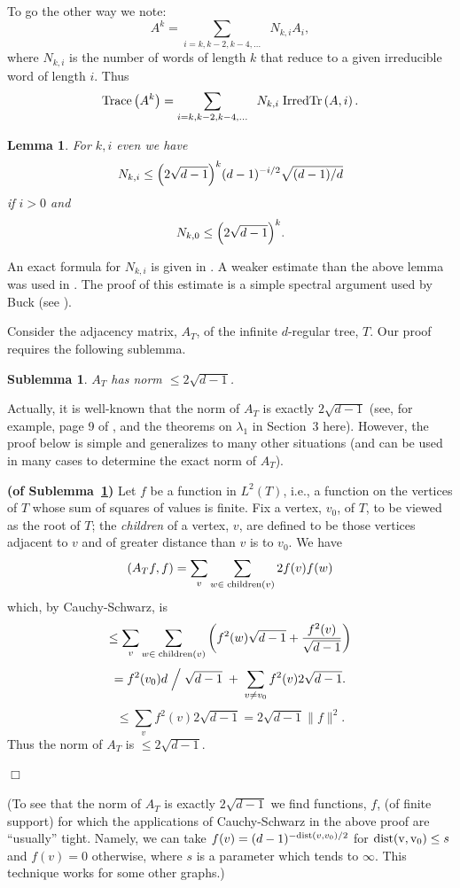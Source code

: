 \documentclass[12pt]{article}
\newtheorem{lemma}[theorem]{Lemma}
\newtheorem{sublemma}[theorem]{Sublemma}
\newcommand{\irdtr}[2]{{\rm IrredTr}\left(#1,#2\right)}
\newcommand{\proof}{{\par\noindent {\bf Proof}\space\space}}
\newcommand{\proofbox}{\begin{flushright}$\Box$\end{flushright}}
\newcommand{\Trace}[1]{{\rm Trace}\left( #1 \right) }
\begin{document}
To go the other way
we note:
\begin{equation}\label{eq:other_way}
A^k = \sum_{i=k,k-2,k-4,\ldots} \;\; N_{k,i} A_i,
\end{equation}
where $N_{k,i}$ is the number of words of length $k$ that reduce to a given
irreducible word
of length $i$.
Thus
$$
\Trace{A^k} = \sum_{i=k,k-2,k-4,\ldots} \;\; N_{k,i} \;\irdtr{A}{i}.
$$
\begin{lemma}\label{lm:reducedwalks}
For $k,i$ even we have
$$
N_{k,i} \le \Bigl( 2\sqrt{d-1}\Bigr)^k (d-1)^{-i/2}\sqrt{(d-1)/d}
$$
if $i>0$ and
$$
N_{k,0} \le \Bigl( 2\sqrt{d-1}\Bigr)^k.
$$
\end{lemma}
An exact formula for $N_{k,i}$ is given in \cite{mckay}.  A weaker
estimate than the above lemma
was used in \cite{friedman_random_graphs}.  The proof of this
estimate is a simple spectral argument used by Buck (see \cite{buck,
friedman_relative}).
\proof 
Consider
the adjacency matrix, $A_T$, of the infinite $d$-regular tree, $T$.
Our proof requires the following sublemma.
\begin{sublemma}\label{lm:tree_norm}
$A_T$ has norm $\le 2\sqrt{d-1}$.
\end{sublemma}
Actually, it is well-known that the norm of $A_T$ is exactly $2\sqrt{d-1}$
(see, for example, page 9 of
\cite{woess}, and the theorems on $\lambda_1$ in Section~3
here).  However, the proof below is simple and generalizes to many other
situations (and can be used in many cases to determine the exact norm of
$A_T$).
\proof {\bf (of Sublemma~\ref{lm:tree_norm})}\space\space
Let $f$ be a function in $L^2(T)$, i.e., a function on the vertices
of $T$ whose sum of squares of values is finite.  Fix a vertex, $v_0$, of $T$,
to be viewed as the root of $T$; the {\em children} of a vertex, $v$, are
defined to be those vertices adjacent to $v$ and of greater distance 
than $v$ is to
$v_0$.
We have
$$
(A_Tf,f) = \sum_v\sum_{w\in\;{\rm children}(v)} 2 f(v)f(w)
$$
which, by Cauchy-Schwarz, is
$$
\le \sum_v\sum_{w\in\;{\rm children}(v)} \left( f^2(w)\sqrt{d-1} + 
\frac{f^2(v)}{\sqrt{d-1}} \right)
$$
$$
= f^2(v_0)d\Bigm/\sqrt{d-1}\;+\; \sum_{v\ne v_0} f^2(v)2\sqrt{d-1}.
$$
$$
\le \sum_v f^2(v) 2\sqrt{d-1} = 2\sqrt{d-1} \|f\|^2.
$$
Thus the norm of $A_T$ is $\le2\sqrt{d-1}$.
\proofbox
(To see that the norm of $A_T$ is exactly $2\sqrt{d-1}$ we find functions,
$f$, (of finite support)
for which the applications of Cauchy-Schwarz in the above proof are
``usually'' tight.  
Namely, we can take
$f(v)=(d-1)^{-{\rm dist}(v,v_0)/2}$ for ${\rm dist(v,v_0)}\le s$ and
$f(v)=0$ otherwise, where $s$ is a parameter which tends to $\infty$.
This technique works for some other graphs.)
\end{document}
